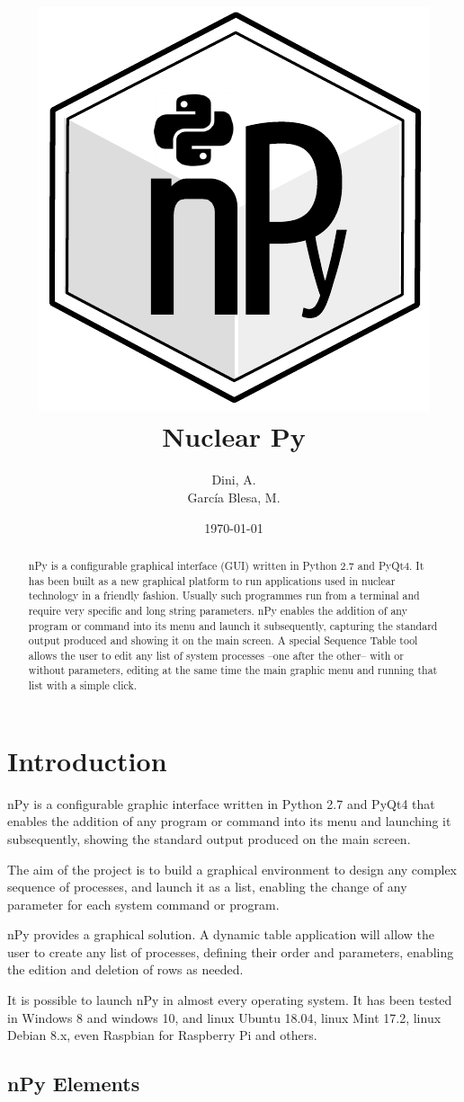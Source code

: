 \documentclass[a4paper,10pt]{article}
\author{Dini, A. \\García Blesa, M.}%
\date{\today}%
\title{\includegraphics[scale=0.5]{img/nPyLogo.pdf}\\\textbf{Nuclear Py}}%
\begin{document}
\maketitle

\begin{abstract}
nPy is a configurable graphical interface (GUI) written in Python 2.7 and PyQt4. It has been built as a new graphical platform to run applications used in nuclear technology in a friendly fashion. Usually such programmes run from a terminal and require very specific and long string parameters. nPy enables the addition of any program or command into its menu and launch it subsequently, capturing the standard output produced and showing it on the main screen. A special Sequence Table tool allows the user to edit any list of system processes –one after the other– with or without parameters, editing at the same time the main graphic menu and running that list with a simple click.
\end{abstract}
\newpage

\tableofcontents
\newpage

\section{Introduction}

nPy is a configurable graphic interface written in Python 2.7 and PyQt4 that enables the addition of any program or command into its menu and launching it subsequently, showing the standard output produced on the main screen.

The aim of the project is to build a graphical environment to design any complex sequence of processes, and launch it as a list, enabling the change of any parameter for each system command or program.

nPy provides a graphical solution. A dynamic table application will allow the user to create any list of processes, defining their order and parameters, enabling the edition and deletion of rows as needed.

It is possible to launch nPy in almost every operating system. It has been tested in Windows 8 and windows 10, and linux Ubuntu 18.04, linux Mint 17.2, linux Debian 8.x, even Raspbian for Raspberry Pi and others.

\subsection{nPy Elements}
\end{document}
